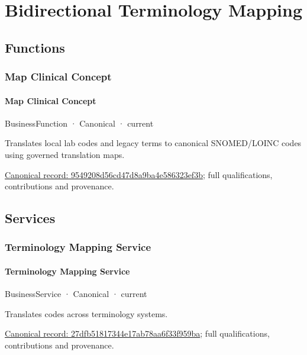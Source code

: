 \section{Bidirectional Terminology Mapping}

\subsection{Functions}

\subsubsection{Map Clinical Concept}

\paragraph{Map Clinical Concept}

\label{element:9549208d56cd47d8a9ba4e586323ef3b}
{\small BusinessFunction · Canonical · current}\par

Translates local lab codes and legacy terms to canonical SNOMED/LOINC codes using governed translation maps.


{\footnotesize \href{../../../../continuum/business/business-function/9549208d56cd47d8a9ba4e586323ef3b.md}{Canonical record: 9549208d56cd47d8a9ba4e586323ef3b}; full qualifications, contributions and provenance.}\par
\subsection{Services}

\subsubsection{Terminology Mapping Service}

\paragraph{Terminology Mapping Service}

\label{element:27dfb51817344e17ab78aa6f33f959ba}
{\small BusinessService · Canonical · current}\par

Translates codes across terminology systems.


{\footnotesize \href{../../../../continuum/business/business-service/27dfb51817344e17ab78aa6f33f959ba.md}{Canonical record: 27dfb51817344e17ab78aa6f33f959ba}; full qualifications, contributions and provenance.}\par
